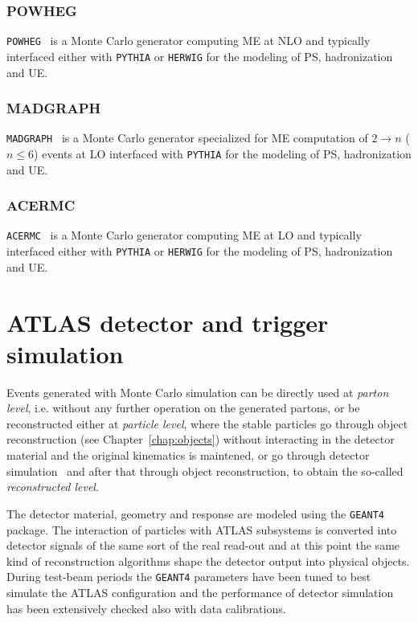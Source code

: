 \subsubsection*{POWHEG}

\texttt{POWHEG}~\cite{powheg} is a Monte Carlo generator computing
ME at NLO and typically interfaced either with \texttt{PYTHIA} or 
\texttt{HERWIG} for the modeling of PS, hadronization and UE.


\subsubsection*{MADGRAPH}

\texttt{MADGRAPH}~\cite{madgraph} is a Monte Carlo generator 
specialized for ME computation of $2 \to n$ ($n\leq 6$) events at LO
interfaced with \texttt{PYTHIA} for the modeling of PS, hadronization and UE.


\subsubsection*{ACERMC}

\texttt{ACERMC}~\cite{acermc} is a Monte Carlo generator computing
ME at LO and typically interfaced either with \texttt{PYTHIA} or 
\texttt{HERWIG} for the modeling of PS, hadronization and UE.



\section{ATLAS detector and trigger simulation}\label{sec:MCdetector}

Events generated with Monte Carlo simulation can be directly
used at {\it parton level}, i.e. without any further operation on the
generated partons, or be reconstructed either at {\it particle level}, where
the stable particles go through object reconstruction (see Chapter~\ref{chap:objects})
without interacting in the detector material and the original kinematics is
maintened, or go through detector simulation~\cite{atlas_sim} and after that through object
reconstruction, to obtain the so-called {\it reconstructed level}.

The detector material, geometry and response %
are modeled using the {\tt GEANT4}~\cite{geant} package.
The interaction of particles with ATLAS subsystems is converted
into detector signals of the same sort of the real read-out and
at this point the same kind of reconstruction algorithms shape
the detector output into physical objects. During test-beam periods
the \texttt{GEANT4} parameters have been tuned to best simulate
the ATLAS configuration and the performance of detector simulation
has been extensively checked also with data calibrations.

